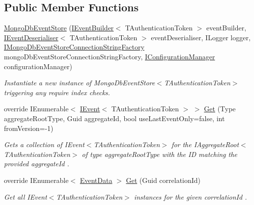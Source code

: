 \subsection*{Public Member Functions}
\begin{DoxyCompactItemize}
\item 
\hyperlink{classCqrs_1_1MongoDB_1_1Events_1_1MongoDbEventStore_a37e57e6f1e4e545630c1c98a5aab46a3_a37e57e6f1e4e545630c1c98a5aab46a3}{Mongo\+Db\+Event\+Store} (\hyperlink{interfaceCqrs_1_1Events_1_1IEventBuilder}{I\+Event\+Builder}$<$ T\+Authentication\+Token $>$ event\+Builder, \hyperlink{interfaceCqrs_1_1Events_1_1IEventDeserialiser}{I\+Event\+Deserialiser}$<$ T\+Authentication\+Token $>$ event\+Deserialiser, I\+Logger logger, \hyperlink{interfaceCqrs_1_1MongoDB_1_1Events_1_1IMongoDbEventStoreConnectionStringFactory}{I\+Mongo\+Db\+Event\+Store\+Connection\+String\+Factory} mongo\+Db\+Event\+Store\+Connection\+String\+Factory, \hyperlink{interfaceCqrs_1_1Configuration_1_1IConfigurationManager}{I\+Configuration\+Manager} configuration\+Manager)
\begin{DoxyCompactList}\small\item\em Instantiate a new instance of Mongo\+Db\+Event\+Store$<$\+T\+Authentication\+Token$>$ triggering any require index checks. \end{DoxyCompactList}\item 
override I\+Enumerable$<$ \hyperlink{interfaceCqrs_1_1Events_1_1IEvent}{I\+Event}$<$ T\+Authentication\+Token $>$ $>$ \hyperlink{classCqrs_1_1MongoDB_1_1Events_1_1MongoDbEventStore_a7a1ac8e59dc5bff0bb6562fb4f43e8df_a7a1ac8e59dc5bff0bb6562fb4f43e8df}{Get} (Type aggregate\+Root\+Type, Guid aggregate\+Id, bool use\+Last\+Event\+Only=false, int from\+Version=-\/1)
\begin{DoxyCompactList}\small\item\em Gets a collection of I\+Event$<$\+T\+Authentication\+Token$>$ for the I\+Aggregate\+Root$<$\+T\+Authentication\+Token$>$ of type {\itshape aggregate\+Root\+Type}  with the ID matching the provided {\itshape aggregate\+Id} . \end{DoxyCompactList}\item 
override I\+Enumerable$<$ \hyperlink{classCqrs_1_1Events_1_1EventData}{Event\+Data} $>$ \hyperlink{classCqrs_1_1MongoDB_1_1Events_1_1MongoDbEventStore_ac886ca0a57ad86cb99ef0a3767db9280_ac886ca0a57ad86cb99ef0a3767db9280}{Get} (Guid correlation\+Id)
\begin{DoxyCompactList}\small\item\em Get all I\+Event$<$\+T\+Authentication\+Token$>$ instances for the given {\itshape correlation\+Id} . \end{DoxyCompactList}\end{DoxyCompactItemize}
